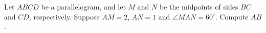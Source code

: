 Let $ABCD$ be a parallelogram, and let $M$ and $N$ be the midpoints of sides $BC$ and $CD$, respectively. Suppose $AM=2$, $AN=1$ and $\angle MAN=60^\circ$. Compute $AB$.

